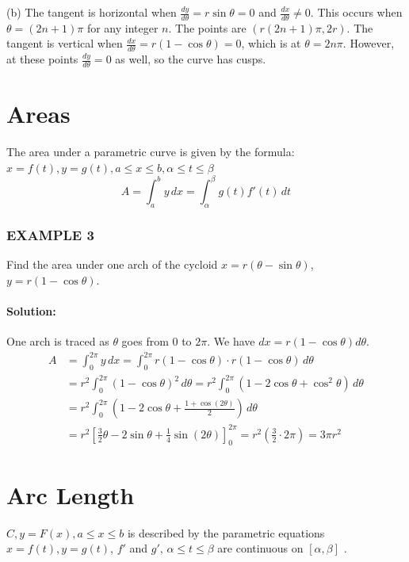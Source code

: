\documentclass{article}
\begin{document}
(b) The tangent is horizontal when $\frac{dy}{d\theta}=r\sin\theta=0$ and $\frac{dx}{d\theta} \neq 0$. This occurs when $\theta = (2n+1)\pi$ for any integer $n$. The points are $(r(2n+1)\pi, 2r)$. The tangent is vertical when $\frac{dx}{d\theta}=r(1-\cos\theta)=0$, which is at $\theta=2n\pi$. However, at these points $\frac{dy}{d\theta}=0$ as well, so the curve has cusps.

\section*{Areas}
The area under a parametric curve is given by the formula:
\\ $x=f(t), y=g(t), a\leq x\leq b, \alpha \leq t\leq \beta $
\[
A = \int_{a}^{b} y \, dx = \int_{\alpha }^{\beta } g(t)f'(t) \, dt
\]

\subsubsection*{EXAMPLE 3}
Find the area under one arch of the cycloid $x=r(\theta-\sin\theta)$, $y=r(1-\cos\theta)$.

\paragraph{Solution:}
One arch is traced as $\theta$ goes from $0$ to $2\pi$. We have $dx = r(1-\cos\theta)d\theta$.
\begin{align*}
    A &= \int_{0}^{2\pi} y \, dx = \int_{0}^{2\pi} r(1-\cos\theta) \cdot r(1-\cos\theta) \, d\theta \\
    &= r^2 \int_{0}^{2\pi} (1-\cos\theta)^2 \, d\theta = r^2 \int_{0}^{2\pi} (1 - 2\cos\theta + \cos^2\theta) \, d\theta \\
    &= r^2 \int_{0}^{2\pi} \left(1 - 2\cos\theta + \frac{1+\cos(2\theta)}{2}\right) \, d\theta \\
    &= r^2 \left[ \frac{3}{2}\theta - 2\sin\theta + \frac{1}{4}\sin(2\theta) \right]_{0}^{2\pi} = r^2 \left( \frac{3}{2} \cdot 2\pi \right) = 3\pi r^2
\end{align*}

\section*{Arc Length}
$C, y=F(x), a\leqslant x\leqslant b$ is described by the parametric equations $ x=f(t), y=g(t)$, $f'$ and $g'$, $\alpha\leqslant t\leqslant \beta$ are continuous on $[\alpha, \beta]$ .
\end{document}
